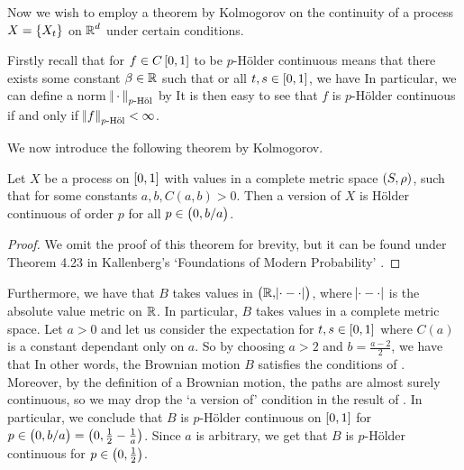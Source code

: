 \documentclass[../main.tex]{subfiles}
\begin{document}
Now we wish to employ a theorem by Kolmogorov on the continuity of a process $X = \cbr{X_t}$ on $\operatorname{\mathbb{R}}^d$ under certain conditions.

Firstly recall that for $f\in C\intcc{0,1}$ to be $p$-H\"older continuous means that there exists some constant $\beta\in\operatorname{\mathbb{R}}$ such that or all $t,s\in\intcc{0,1}$, we have  In particular, we can define a norm $\norm{\,\cdot\,}_{p\text{-H\"ol}}$ by  It is then easy to see that $f$ is $p$-H\"older continuous if and only if $\norm{f}_{p\text{-H\"ol}}<\infty$.

We now introduce the following theorem by Kolmogorov.
\begin{theorem}
\label{the:kolmogorov}
Let $X$ be a process on $\intcc{0,1}$ with values in a complete metric space $\del{S,\rho}$, such that  for some constants $a,b,C(a,b)>0$. Then a version of $X$ is H\"older continuous of order $p$ for all $p\in\intoo{0,b/a}$.
\end{theorem}
\begin{proof}
We omit the proof of this theorem for brevity, but it can be found under Theorem 4.23 in Kallenberg's `Foundations of Modern Probability' \cite{Kallenberg2021}.
\end{proof}

Furthermore, we have that $B$ takes values in $\del{\R,\abs{\cdot-\cdot}}$, where $\abs{\cdot-\cdot}$ is the absolute value metric on $\operatorname{\mathbb{R}}$. In particular, $B$ takes values in a complete metric space. Let $a>0$ and let us consider the expectation for $t,s\in\intcc{0,1}$  where $C(a)$ is a constant dependant only on $a$. So by choosing $a>2$ and $b = \frac{a-2}{2}$, we have that  In other words, the Brownian motion $B$ satisfies the conditions of . Moreover, by the definition of a Brownian motion, the paths are almost surely continuous, so we may drop the `a version of' condition in the result of . In particular, we conclude that $B$ is $p$-H\"older continuous on $\intcc{0,1}$ for $p\in\intoo{0,b/a} = \intoo{0,\frac12 - \frac1a}$. Since $a$ is arbitrary, we get that $B$ is $p$-H\"older continuous for $p\in\intoo{0,\frac12}$.
\end{document}
